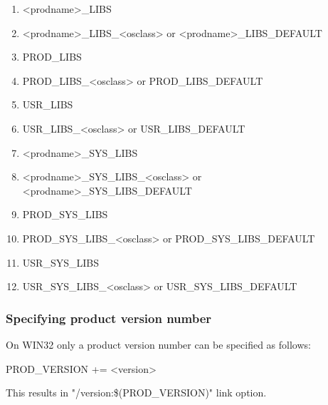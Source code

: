 \begin{enumerate}\item \textless{}prodname\textgreater{}\_LIBS

\item \textless{}prodname\textgreater{}\_LIBS\_\textless{}osclass\textgreater{} or \textless{}prodname\textgreater{}\_LIBS\_DEFAULT

\item {}PROD\_LIBS

\item PROD\_LIBS\_\textless{}osclass\textgreater{} or PROD\_LIBS\_DEFAULT

\item {}USR\_LIBS

\item USR\_LIBS\_\textless{}osclass\textgreater{} or USR\_LIBS\_DEFAULT

\item \textless{}prodname\textgreater{}\_SYS\_LIBS

\item \textless{}prodname\textgreater{}\_SYS\_LIBS\_\textless{}osclass\textgreater{} or \textless{}prodname\textgreater{}\_SYS\_LIBS\_DEFAULT

\item {}PROD\_SYS\_LIBS

\item PROD\_SYS\_LIBS\_\textless{}osclass\textgreater{} or PROD\_SYS\_LIBS\_DEFAULT

\item {}USR\_SYS\_LIBS

\item USR\_SYS\_LIBS\_\textless{}osclass\textgreater{} or USR\_SYS\_LIBS\_DEFAULT

\end{enumerate}\subsubsection{Specifying product version number}

On WIN32 only a product version number can be specified as follows:

\begin{description}\item {}PROD\_VERSION += \textless{}version\textgreater{}

\end{description}This results in "/version:\$(PROD\_VERSION)" link option.

